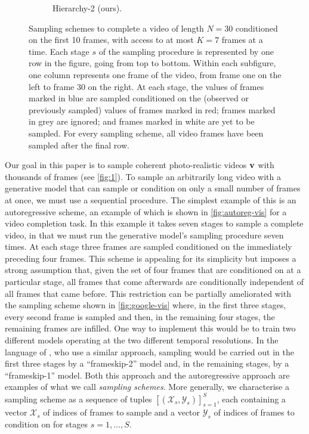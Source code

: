 \begin{figure}[t!]
\begin{subfigure}[t]{0.24\textwidth}
        \caption{Hierarchy-2 (ours).} \label{fig:hierarchy-vis}
    \end{subfigure}%
    \caption{Sampling schemes to complete a video of length $N=30$ conditioned on the first 10 frames, with access to at most $K=7$ frames at a time. Each stage $s$ of the sampling procedure is represented by one row in the figure, going from top to bottom. Within each subfigure, one column represents one frame of the video, from frame one on the left to frame 30 on the right. At each stage, the values of frames marked in blue are sampled conditioned on the (observed or previously sampled) values of frames marked in red; frames marked in grey are ignored; and frames marked in white are yet to be sampled. For every sampling scheme, all video frames have been sampled after the final row.
    }
\end{figure}

Our goal in this paper is to sample coherent photo-realistic videos ${\mathbf{v}}$ with thousands of frames (see \cref{fig:1}). 
%
To sample an arbitrarily long video with a generative model that can sample or condition on only a small number of frames at once, we must use a sequential procedure. The simplest example of this is an autoregressive scheme, an example of which is shown in \cref{fig:autoreg-vis} for a video completion task. 
%
In this example it takes seven stages to sample a complete video, in that we must run the generative model's sampling procedure seven times. 
%
At each stage three frames are sampled conditioned on the immediately preceding four frames. This scheme is appealing for its simplicity but imposes a strong assumption that, given the set of four frames that are conditioned on at a particular stage, all frames that come afterwards are conditionally independent of all frames that came before. This restriction can be partially ameliorated with the sampling scheme shown in \cref{fig:google-vis} where, in the first three stages, every second frame is sampled and then, in the remaining four stages, the remaining frames are infilled. One way to implement this would be to train two different models operating at the two different temporal resolutions. 
%
In the language of \citet{ho2022video}, who use a similar approach, sampling would be carried out in the first three stages by a ``frameskip-2'' model and, in the remaining stages, by a ``frameskip-1'' model. Both this approach and the autoregressive approach are examples of what we call \textit{sampling schemes}.
%
More generally, we characterise a sampling scheme as a sequence of tuples $[(\mathcal{X}_s, \mathcal{Y}_s)]_{s=1}^S$, each containing a vector $\mathcal{X}_s$ of indices of frames to sample and a vector $\mathcal{Y}_s$ of indices of frames to condition on for stages $s = 1,\ldots,S$. 

